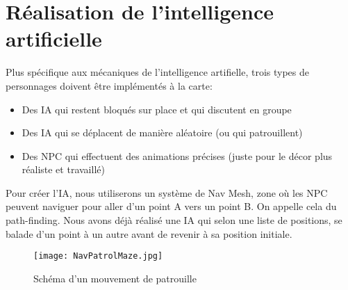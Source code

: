 \documentclass[../doc.tex]{subfiles}
\begin{document}
\section{Réalisation de l'intelligence artificielle}
Plus spécifique aux mécaniques de l'intelligence artifielle,
 trois types de personnages doivent être implémentés à la carte:
\begin{itemize}
    \item Des IA qui restent bloqués sur place et qui discutent en groupe
    \item Des IA qui se déplacent de manière aléatoire (ou qui patrouillent)
    \item Des NPC qui effectuent des animations précises
        (juste pour le décor plus réaliste et travaillé)
\end{itemize}

Pour créer l'IA, nous utiliserons un système de Nav Mesh, zone où les NPC peuvent naviguer pour aller d'un point A vers un point B. On appelle cela du path-finding.
Nous avons déjà réalisé une IA qui selon une liste de positions, se balade d'un point à un autre avant de revenir à sa position initiale.

\begin{figure}[h]
    \centering
    \texttt{[image: NavPatrolMaze.jpg]}
    \caption{Schéma d'un mouvement de patrouille}
\end{figure}
\end{document}
